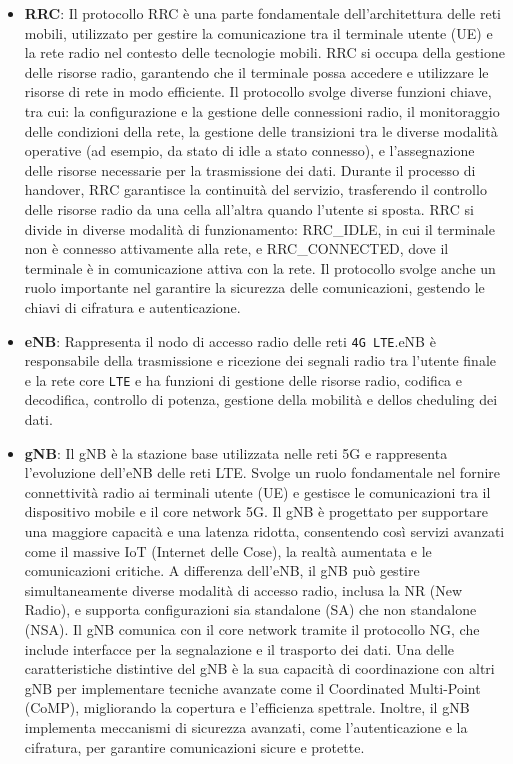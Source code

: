 \documentclass[english]{article}
\begin{document}
\begin{itemize}
	\item \textbf{\hypertarget{RRC}{RRC}}: Il protocollo RRC è una parte fondamentale
	      dell'architettura delle reti mobili, utilizzato per gestire la comunicazione
	      tra il terminale utente (UE) e la rete radio nel contesto delle tecnologie
	      mobili. RRC si occupa della gestione delle risorse radio,
	      garantendo che il terminale possa accedere e utilizzare le risorse di rete
	      in modo efficiente. Il protocollo svolge diverse funzioni chiave, tra cui:
	      la configurazione e la gestione delle connessioni radio,
	      il monitoraggio delle condizioni della rete, la gestione delle
	      transizioni tra le diverse modalità operative (ad esempio, da stato di
	      idle a stato connesso), e l'assegnazione delle risorse necessarie per la
	      trasmissione dei dati. Durante il processo di handover, RRC garantisce la
	      continuità del servizio, trasferendo il controllo delle risorse radio da una
	      cella all'altra quando l'utente si sposta. RRC si divide in diverse modalità
	      di funzionamento: RRC\_IDLE, in cui il terminale non è connesso attivamente alla
	      rete, e RRC\_CONNECTED, dove il terminale è in comunicazione attiva con la rete.
	      Il protocollo svolge anche un ruolo importante nel garantire la sicurezza
	      delle comunicazioni, gestendo le chiavi di cifratura e autenticazione.

	\item \textbf{eNB}\hypertarget{eNB}{}:
	      Rappresenta il  nodo di accesso radio delle reti
	      \texttt{4G LTE}.\@ eNB è responsabile della trasmissione
	      e ricezione dei segnali radio tra l'utente finale e la
	      rete core \texttt{LTE} e ha funzioni di gestione delle
	      risorse radio, codifica e decodifica, controllo di potenza,
	      gestione della mobilità e dellos cheduling dei dati.

	\item \textbf{\hypertarget{gNB}{gNB}}:
	      Il gNB è la stazione base utilizzata nelle reti 5G
	      e rappresenta l'evoluzione dell'eNB delle reti LTE.
	      Svolge un ruolo fondamentale nel fornire connettività
	      radio ai terminali utente (UE) e gestisce le comunicazioni
	      tra il dispositivo mobile e il core network 5G.
	      Il gNB è progettato per supportare una maggiore capacità e una latenza ridotta,
	      consentendo così servizi avanzati come il massive IoT (Internet delle Cose),
	      la realtà aumentata e le comunicazioni critiche. A differenza dell'eNB,
	      il gNB può gestire simultaneamente diverse modalità di accesso radio,
	      inclusa la NR (New Radio), e supporta configurazioni sia standalone (SA)
	      che non standalone (NSA). Il gNB comunica con il core network tramite il
	      protocollo NG, che include interfacce per la segnalazione e il trasporto dei dati.
	      Una delle caratteristiche distintive del gNB è la sua capacità di coordinazione
	      con altri gNB per implementare tecniche avanzate come il
	      Coordinated Multi-Point (CoMP), migliorando la copertura e
	      l'efficienza spettrale. Inoltre,
	      il gNB implementa meccanismi di sicurezza avanzati,
	      come l'autenticazione e la cifratura, per garantire
	      comunicazioni sicure e protette.


\end{itemize}
\end{document}
